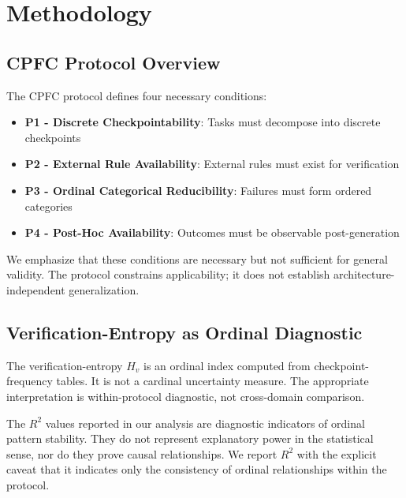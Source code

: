 \section{Methodology}\label{sec:method}

\subsection{CPFC Protocol Overview}

The CPFC protocol defines four necessary conditions:
\begin{itemize}
    \item \textbf{P1 - Discrete Checkpointability}: Tasks must decompose into discrete checkpoints
    \item \textbf{P2 - External Rule Availability}: External rules must exist for verification
    \item \textbf{P3 - Ordinal Categorical Reducibility}: Failures must form ordered categories
    \item \textbf{P4 - Post-Hoc Availability}: Outcomes must be observable post-generation
\end{itemize}

We emphasize that these conditions are necessary but not sufficient for general validity. The protocol constrains applicability; it does not establish architecture-independent generalization.

\subsection{Verification-Entropy as Ordinal Diagnostic}

The verification-entropy $H_v$ is an ordinal index computed from checkpoint-frequency tables. It is not a cardinal uncertainty measure. The appropriate interpretation is within-protocol diagnostic, not cross-domain comparison.

The $R^2$ values reported in our analysis are diagnostic indicators of ordinal pattern stability. They do not represent explanatory power in the statistical sense, nor do they prove causal relationships. We report $R^2$ with the explicit caveat that it indicates only the consistency of ordinal relationships within the protocol.

